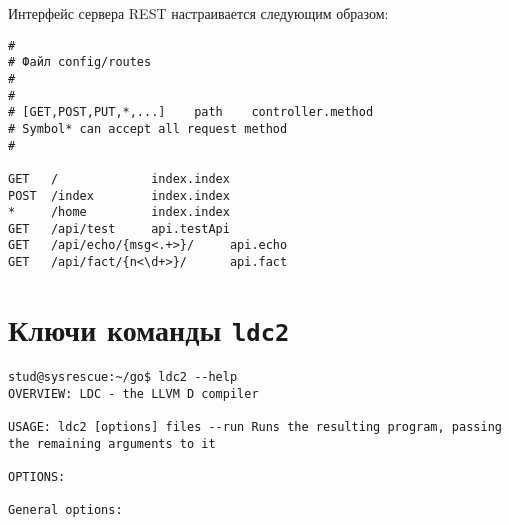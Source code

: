 \documentclass[732]{studrep}
\begin{document}
Интерфейс сервера REST настраивается следующим образом:
\begin{verbatim}
#
# Файл config/routes
#
#
# [GET,POST,PUT,*,...]    path    controller.method
# Symbol* can accept all request method
#

GET   /             index.index
POST  /index        index.index
*     /home         index.index
GET   /api/test     api.testApi
GET   /api/echo/{msg<.+>}/     api.echo
GET   /api/fact/{n<\d+>}/      api.fact
\end{verbatim}


\chapter{Ключи команды \texttt{ldc2}}\label{chap:cmds}
\begin{verbatim}
stud@sysrescue:~/go$ ldc2 --help
OVERVIEW: LDC - the LLVM D compiler

USAGE: ldc2 [options] files --run Runs the resulting program, passing the remaining arguments to it

OPTIONS:

General options:


\end{verbatim}
\end{document}
